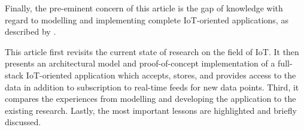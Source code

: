 Finally, the pre-eminent concern of this article is the gap of knowledge with regard to modelling and implementing complete IoT-oriented applications, as described by \textcite{paganelli-turchi-guili:a-web-of-things-framework-for-restful-applications-and-its-experimentation-in-a-smart-city}. 

This article first revisits the current state of research on the field of IoT. It then presents an architectural model and proof-of-concept implementation of a full-stack IoT-oriented application which accepts, stores, and provides access to the data in addition to subscription to real-time feeds for new data points. Third, it compares the experiences from modelling and developing the application to the existing research. Lastly, the most important lessons are highlighted and briefly discussed.
